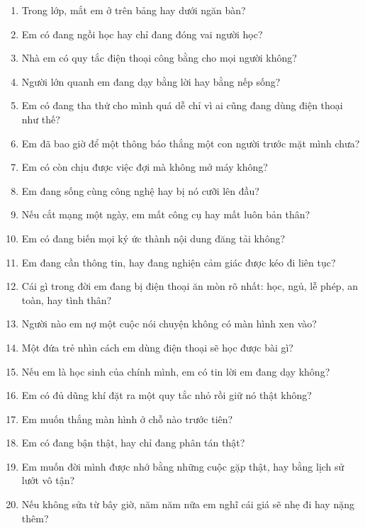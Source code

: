 \begin{tcolorbox}[colback=bookbg,colframe=booksecondary,arc=4pt,boxrule=0.8pt,enhanced,breakable]
\begin{enumerate}[leftmargin=0.9cm]
\item Trong lớp, mắt em ở trên bảng hay dưới ngăn bàn?
\item Em có đang ngồi học hay chỉ đang đóng vai người học?
\item Nhà em có quy tắc điện thoại công bằng cho mọi người không?
\item Người lớn quanh em đang dạy bằng lời hay bằng nếp sống?
\item Em có đang tha thứ cho mình quá dễ chỉ vì ai cũng đang dùng điện thoại như thế?
\item Em đã bao giờ để một thông báo thắng một con người trước mặt mình chưa?
\item Em có còn chịu được việc đợi mà không mở máy không?
\item Em đang sống cùng công nghệ hay bị nó cưỡi lên đầu?
\item Nếu cắt mạng một ngày, em mất công cụ hay mất luôn bản thân?
\item Em có đang biến mọi ký ức thành nội dung đăng tải không?
\item Em đang cần thông tin, hay đang nghiện cảm giác được kéo đi liên tục?
\item Cái gì trong đời em đang bị điện thoại ăn mòn rõ nhất: học, ngủ, lễ phép, an toàn, hay tình thân?
\item Người nào em nợ một cuộc nói chuyện không có màn hình xen vào?
\item Một đứa trẻ nhìn cách em dùng điện thoại sẽ học được bài gì?
\item Nếu em là học sinh của chính mình, em có tin lời em đang dạy không?
\item Em có đủ dũng khí đặt ra một quy tắc nhỏ rồi giữ nó thật không?
\item Em muốn thắng màn hình ở chỗ nào trước tiên?
\item Em có đang bận thật, hay chỉ đang phân tán thật?
\item Em muốn đời mình được nhớ bằng những cuộc gặp thật, hay bằng lịch sử lướt vô tận?
\item Nếu không sửa từ bây giờ, năm năm nữa em nghĩ cái giá sẽ nhẹ đi hay nặng thêm?
\end{enumerate}
\end{tcolorbox}

\ngancach